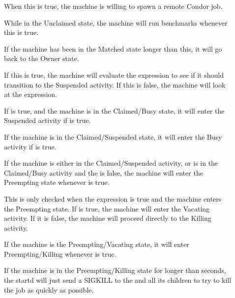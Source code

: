 \begin{description}
  
\item[] When this is true, the machine is willing to spawn
  a remote Condor job.
  
\item[] While in the Unclaimed state, the machine
  will run benchmarks whenever this is true.
  
\item[] If the machine has been in the Matched
  state longer than this, it will go back to the Owner state.
  
\item[] If this is true, the machine will evaluate
  the  expression to see if it should transition to the
  Suspended activity.  If this is false, the machine will look at
  the  expression.
  
\item[] If  is true, and the machine
  is in the Claimed/Busy state, it will enter the Suspended activity
  if  is true.
  
\item[] If the machine is in the Claimed/Suspended
  state, it will enter the Busy activity if  is true.
  
\item[] If the machine is either in the Claimed/Suspended
  activity, or is in the Claimed/Busy activity and the
   is false, the machine will enter the Preempting
  state whenever  is true. 
  
\item[] This is only checked when the
   expression is true and the machine enters the
  Preempting state.
  If  is true, the machine will enter the Vacating
  activity.  
  If it is false, the machine will proceed directly to the Killing
  activity.  
  
\item[] If the machine is the Preempting/Vacating state, it
  will enter Preempting/Killing whenever  is true. 
  
\item[] If the machine is in the
  Preempting/Killing state for longer than 
  seconds, the startd will just send a SIGKILL to the 
  and all its children to try to kill the job as quickly as possible.
  

\end{description}
